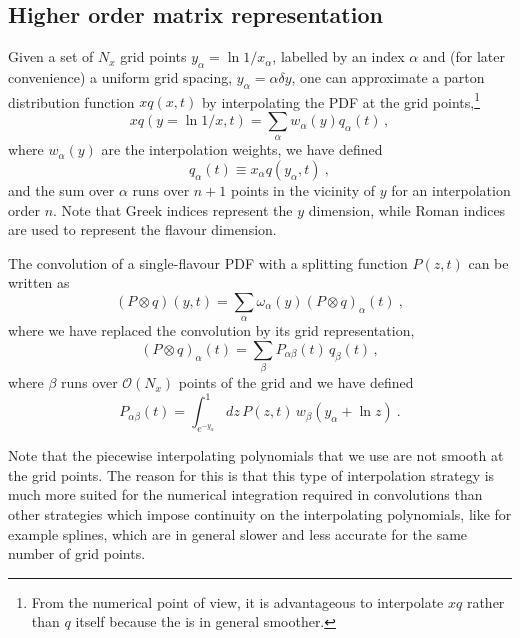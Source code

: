 \documentclass[12pt]{article}
\newcommand{\lp}{\left(}
\newcommand{\rp}{\right)}
\begin{document}
\subsection{Higher order matrix representation}
\label{sec:highord}


Given a set of $N_x$ grid points $y_\alpha=\ln 1/x_{\alpha}$, 
labelled by an
index $\alpha$ and
(for later convenience) a uniform grid spacing, $y_\alpha = \alpha \delta
y$, one can approximate a parton distribution function 
$xq \lp x,t \rp$ by
interpolating the PDF at the grid points,\footnote{From the 
numerical point of view, it is
advantageous to interpolate $xq$ rather than $q$ itself because
the is in general smoother.}
\begin{equation}
  xq(y=\ln 1/x,t) = \sum_\alpha w_\alpha(y) q_\alpha(t)\,,
\end{equation}
where $w_\alpha(y)$ are the interpolation weights, 
we have defined
\begin{equation}
 q_{\alpha}(t) \equiv
x_{\alpha}q(y_\alpha,t) \ ,
\end{equation}
and the sum over $\alpha$ runs over $n+1$ points in the
vicinity of $y$ for an interpolation order $n$. Note that Greek
indices represent the $y$ dimension, while  Roman indices
are  used to represent the flavour dimension.


The convolution of a single-flavour PDF with a splitting function
$P(z,t)$ can be written as
\begin{equation}
  (P \otimes q)(y,t) = \sum_{\alpha} \omega_{\alpha}(y)
 (P \otimes q)_\alpha(t) \ ,
\end{equation}
where we have replaced the convolution by its grid representation,
\begin{equation}
  (P \otimes q)_\alpha(t) = \sum_{\beta} P_{\alpha\beta}(t) \, q_\beta(t)\,,
\end{equation}
where $\beta$ runs over $\mathcal{O}\lp N_x \rp$ points of the grid and we have
defined
\begin{equation}
  \label{eq:Palphabeta}
  P_{\alpha\beta}(t) = \int_{e^{-y_{\alpha}}}^1 dz
 \,P(z,t)\, w_\beta(y_\alpha + \ln z)\  .
\end{equation}

Note that the piecewise  interpolating polynomials 
that we use are not smooth at the
grid points. The reason for this is that this type of interpolation
strategy is much more suited for the numerical integration required
in convolutions than other strategies which impose continuity
on the interpolating polynomials, like for example splines, which
are in general slower and less accurate for the same number
of grid points.
\end{document}
